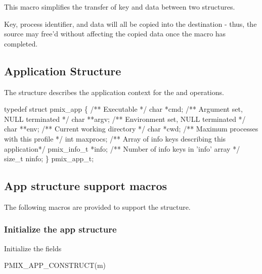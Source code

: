 This macro simplifies the transfer of key and data between two structures.

\adviceuserstart
Key, process identifier, and data will all be copied into the destination  - thus, the source  may free'd without affecting the copied data once the macro has completed.
\adviceuserend


\subsection{Application Structure}

The  structure describes the application context for the  and  operations.

\cspecificstart
\begin{codepar}
typedef struct pmix_app \{
    /** Executable */
    char *cmd;
    /** Argument set, NULL terminated */
    char **argv;
    /** Environment set, NULL terminated */
    char **env;
    /** Current working directory */
    char *cwd;
    /** Maximum processes with this profile */
    int maxprocs;
    /** Array of info keys describing this application*/
    pmix_info_t *info;
    /** Number of info keys in 'info' array */
    size_t ninfo;
\} pmix_app_t;
\end{codepar}
\cspecificend

\subsection{App structure support macros}
The following macros are provided to support the  structure.

\subsubsection{Initialize the app structure}

Initialize the  fields

\cspecificstart
\begin{codepar}
PMIX_APP_CONSTRUCT(m)
\end{codepar}
\cspecificend

\begin{arglist}
\end{arglist}

